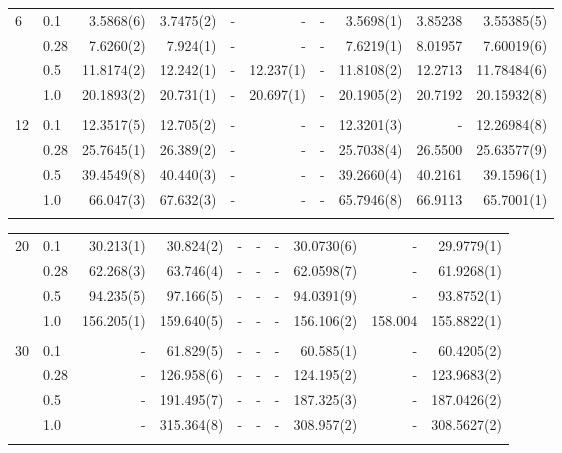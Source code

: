 \begin{landscape}
\begin{table} [H]
\begin{tabularx}{\hsize}{l:l|RRRRRRRR}
		6 & 0.1 & 3.5868(6) & 3.7475(2) & - & - & - & 3.5698(1) & 3.85238 & 3.55385(5) \\ 
		& 0.28 & 7.6260(2) & 7.924(1) & - & - & - & 7.6219(1) & 8.01957 & 7.60019(6) \\
		& 0.5 & 11.8174(2) & 12.242(1) & - & 12.237(1) & - & 11.8108(2) & 12.2713 & 11.78484(6) \\
		& 1.0 & 20.1893(2) & 20.731(1) & - & 20.697(1) & - & 20.1905(2) & 20.7192 & 20.15932(8) \\ \hdashline \\
		
		12 & 0.1 & 12.3517(5) & 12.705(2) & - & - & - & 12.3201(3) & - & 12.26984(8) \\ 
		& 0.28 & 25.7645(1) & 26.389(2) & - & - & - & 25.7038(4) & 26.5500 & 25.63577(9) \\
		& 0.5 & 39.4549(8) & 40.440(3) & - & - & - & 39.2660(4) & 40.2161 & 39.1596(1) \\
		& 1.0 & 66.047(3) & 67.632(3) & - & - & - & 65.7946(8) & 66.9113 & 65.7001(1) \\ \hdashline
	\end{tabularx}
\end{table}

\begin{table} [H]
	\begin{tabularx}{\hsize}{l:l|RRRRRRRR} \\
		\label{tab:quantumdotswinteraction2D2}
		20 & 0.1 & 30.213(1) & 30.824(2) & - & - & - & 30.0730(6) & - & 29.9779(1) \\ 
		& 0.28 & 62.268(3) & 63.746(4) & - & - & - & 62.0598(7) & - & 61.9268(1) \\
		& 0.5 & 94.235(5) & 97.166(5) & - & - & - & 94.0391(9) & - & 93.8752(1) \\
		& 1.0 & 156.205(1) & 159.640(5) & - & - & - & 156.106(2) & 158.004 & 155.8822(1) \\ \hdashline \\
		
		30 & 0.1 & - & 61.829(5) & - & - & - & 60.585(1) & - & 60.4205(2) \\ 
		& 0.28 & - & 126.958(6) & - & - & - & 124.195(2) & - & 123.9683(2) \\
		& 0.5 & - & 191.495(7) & - & - & - & 187.325(3) & - & 187.0426(2) \\
		& 1.0 & - & 315.364(8) & - & - & - & 308.957(2) & - & 308.5627(2) \\ \hdashline \\
		

\end{tabularx}
\end{table}
\end{landscape}
